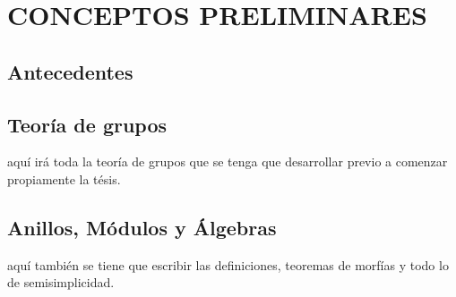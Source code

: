 \chapter{CONCEPTOS PRELIMINARES}

\section{Antecedentes}


\section{Teoría de grupos}
aquí irá toda la teoría de grupos que se tenga que desarrollar previo a comenzar propiamente la tésis.


\section{Anillos, Módulos y Álgebras}

aquí también se tiene que escribir las definiciones, teoremas de morfías y todo lo de semisimplicidad.





